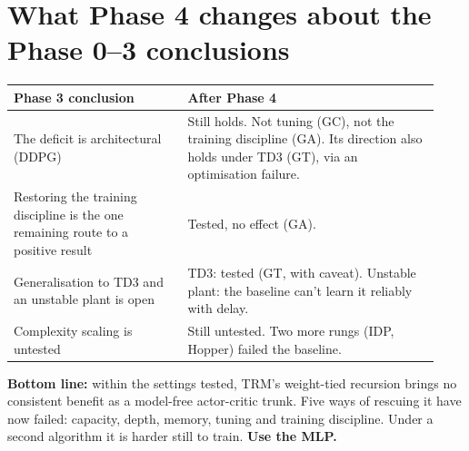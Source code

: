 \documentclass[11pt]{article}
\begin{document}
\section*{What Phase 4 changes about the Phase 0--3 conclusions}



\begin{center}\small\begin{tabular}{>{\raggedright\arraybackslash}p{0.381\linewidth}>{\raggedright\arraybackslash}p{0.553\linewidth}}
\toprule
Phase 3 conclusion & After Phase 4 \\
\midrule
The deficit is architectural (DDPG) & Still holds. Not tuning (GC), not the training discipline (GA). Its direction also holds under TD3 (GT), via an optimisation failure. \\
Restoring the training discipline is the one remaining route to a positive result & Tested, no effect (GA). \\
Generalisation to TD3 and an unstable plant is open & TD3: tested (GT, with caveat). Unstable plant: the baseline can't learn it reliably with delay. \\
Complexity scaling is untested & Still untested. Two more rungs (IDP, Hopper) failed the baseline. \\
\bottomrule
\end{tabular}\end{center}



\textbf{Bottom line:} within the settings tested, TRM's weight-tied recursion brings no consistent benefit as a model-free actor-critic trunk. Five ways of rescuing it have now failed: capacity, depth, memory, tuning and training discipline. Under a second algorithm it is harder still to train. \textbf{Use the MLP.}
\end{document}
